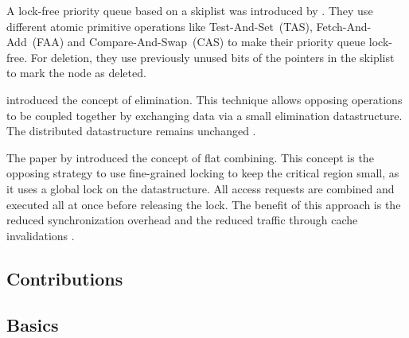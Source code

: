 A lock-free priority queue based on a skiplist was introduced by \citeauthor{sundell_fast_2003}. They use different atomic primitive operations like Test-And-Set~(TAS), Fetch-And-Add~(FAA) and Compare-And-Swap~(CAS) to make their priority queue lock-free. For deletion, they use previously unused bits of the pointers in the skiplist to mark the node as deleted\cite{sundell_fast_2003}.

\citeauthor{shavit_elimination_1997} introduced the concept of elimination. This technique allows opposing operations to be coupled together by exchanging data via a small elimination datastructure. The distributed datastructure remains unchanged \cite{shavit_elimination_1997}.

The paper by \citeauthor{hendler_flat_2010} introduced the concept of flat combining. This concept is the opposing strategy to use fine-grained locking to keep the critical region small, as it uses a global lock on the datastructure. All access requests are combined and executed all at once before releasing the lock. The benefit of this approach is the reduced synchronization overhead and the reduced traffic through cache invalidations \cite{hendler_flat_2010}.

\subsection{Contributions}

\subsection{Basics}


